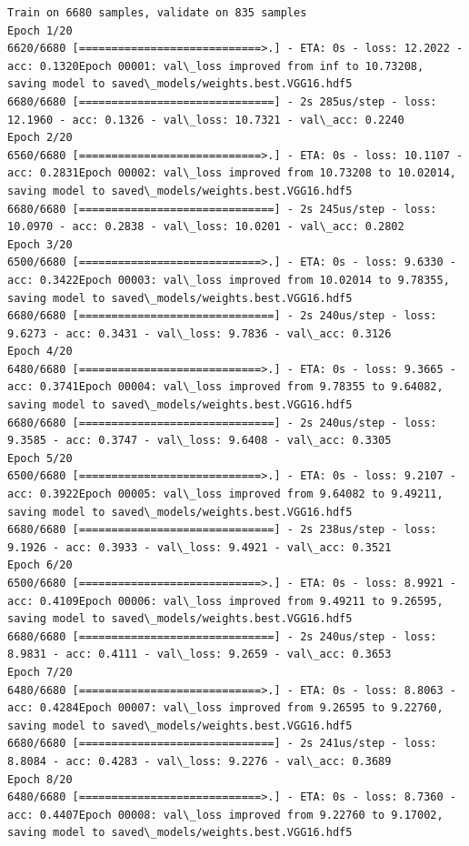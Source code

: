 \documentclass[11pt]{article}
\begin{document}
    \begin{Verbatim}[commandchars=\\\{\}]
Train on 6680 samples, validate on 835 samples
Epoch 1/20
6620/6680 [============================>.] - ETA: 0s - loss: 12.2022 - acc: 0.1320Epoch 00001: val\_loss improved from inf to 10.73208, saving model to saved\_models/weights.best.VGG16.hdf5
6680/6680 [==============================] - 2s 285us/step - loss: 12.1960 - acc: 0.1326 - val\_loss: 10.7321 - val\_acc: 0.2240
Epoch 2/20
6560/6680 [============================>.] - ETA: 0s - loss: 10.1107 - acc: 0.2831Epoch 00002: val\_loss improved from 10.73208 to 10.02014, saving model to saved\_models/weights.best.VGG16.hdf5
6680/6680 [==============================] - 2s 245us/step - loss: 10.0970 - acc: 0.2838 - val\_loss: 10.0201 - val\_acc: 0.2802
Epoch 3/20
6500/6680 [============================>.] - ETA: 0s - loss: 9.6330 - acc: 0.3422Epoch 00003: val\_loss improved from 10.02014 to 9.78355, saving model to saved\_models/weights.best.VGG16.hdf5
6680/6680 [==============================] - 2s 240us/step - loss: 9.6273 - acc: 0.3431 - val\_loss: 9.7836 - val\_acc: 0.3126
Epoch 4/20
6480/6680 [============================>.] - ETA: 0s - loss: 9.3665 - acc: 0.3741Epoch 00004: val\_loss improved from 9.78355 to 9.64082, saving model to saved\_models/weights.best.VGG16.hdf5
6680/6680 [==============================] - 2s 240us/step - loss: 9.3585 - acc: 0.3747 - val\_loss: 9.6408 - val\_acc: 0.3305
Epoch 5/20
6500/6680 [============================>.] - ETA: 0s - loss: 9.2107 - acc: 0.3922Epoch 00005: val\_loss improved from 9.64082 to 9.49211, saving model to saved\_models/weights.best.VGG16.hdf5
6680/6680 [==============================] - 2s 238us/step - loss: 9.1926 - acc: 0.3933 - val\_loss: 9.4921 - val\_acc: 0.3521
Epoch 6/20
6500/6680 [============================>.] - ETA: 0s - loss: 8.9921 - acc: 0.4109Epoch 00006: val\_loss improved from 9.49211 to 9.26595, saving model to saved\_models/weights.best.VGG16.hdf5
6680/6680 [==============================] - 2s 240us/step - loss: 8.9831 - acc: 0.4111 - val\_loss: 9.2659 - val\_acc: 0.3653
Epoch 7/20
6480/6680 [============================>.] - ETA: 0s - loss: 8.8063 - acc: 0.4284Epoch 00007: val\_loss improved from 9.26595 to 9.22760, saving model to saved\_models/weights.best.VGG16.hdf5
6680/6680 [==============================] - 2s 241us/step - loss: 8.8084 - acc: 0.4283 - val\_loss: 9.2276 - val\_acc: 0.3689
Epoch 8/20
6480/6680 [============================>.] - ETA: 0s - loss: 8.7360 - acc: 0.4407Epoch 00008: val\_loss improved from 9.22760 to 9.17002, saving model to saved\_models/weights.best.VGG16.hdf5

\end{Verbatim}
\end{document}
